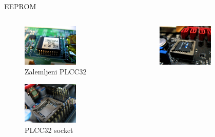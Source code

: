 \documentclass[croatian,t]{beamer} %
\begin{document}
    \begin{frame}{EEPROM}
    	\begin{columns}
    		\begin{column}{4cm}
    			\begin{figure}
					\includegraphics[width=0.62\textwidth]{../pics/800px-Soldered_plcc32.jpg}
					\caption{Zalemljeni PLCC32}
				\end{figure}
				\begin{figure}
					\includegraphics[width=0.62\textwidth]{../pics/800px-Empty_plcc32_socket.jpg}
					\caption{PLCC32 socket}
				\end{figure}
			\end{column}
			\begin{column}{4cm}
				\begin{figure}
					\includegraphics[width=0.62\textwidth]{../pics/800px-Plcc32_in_socket.jpg}

\end{figure}
\end{column}
\end{columns}
\end{frame}
\end{document}
